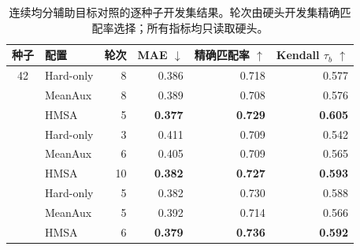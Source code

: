 \begin{table}[H]
\centering
\caption{连续均分辅助目标对照的逐种子开发集结果。轮次由硬头开发集精确匹配率选择；所有指标均只读取硬头。}
\label{tab:dev_meanaux_by_seed}
\small
\begin{tabular}{clrrrr}
\toprule
种子 & 配置 & 轮次 & MAE $\downarrow$ & 精确匹配率 $\uparrow$ & Kendall $\tau_b$ $\uparrow$ \\
\midrule
42 & Hard-only & 8 & 0.386 & 0.718 & 0.577 \\
 & MeanAux & 8 & 0.389 & 0.708 & 0.576 \\
 & HMSA & 5 & \textbf{0.377} & \textbf{0.729} & \textbf{0.605} \\
\addlinespace[2pt]
43 & Hard-only & 3 & 0.411 & 0.709 & 0.542 \\
 & MeanAux & 6 & 0.405 & 0.709 & 0.565 \\
 & HMSA & 10 & \textbf{0.382} & \textbf{0.727} & \textbf{0.593} \\
\addlinespace[2pt]
44 & Hard-only & 5 & 0.382 & 0.730 & 0.588 \\
 & MeanAux & 5 & 0.392 & 0.714 & 0.566 \\
 & HMSA & 6 & \textbf{0.379} & \textbf{0.736} & \textbf{0.592} \\
\bottomrule
\end{tabular}
\end{table}

